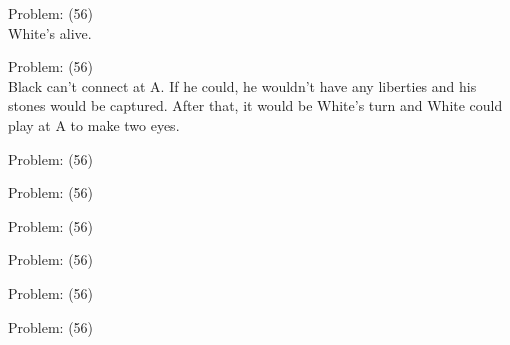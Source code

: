 \documentclass[11pt]{article}
\begin{document}
\begin{minipage}[t]{0.5\textwidth}
  {\centering
  
Problem: (56)\\
White's alive.\\
  }
\end{minipage}
\begin{minipage}[t]{0.5\textwidth}
  {\centering
  
Problem: (56)\\
Black can't connect at A. If he could, he wouldn't have any liberties and his stones would be captured. After that, it would be White’s turn and White could play at A to make two eyes.\\
  }
\end{minipage}
\begin{minipage}[t]{0.5\textwidth}
  {\centering
  
Problem: (56)\\
  }
\end{minipage}
\begin{minipage}[t]{0.5\textwidth}
  {\centering
  
Problem: (56)\\
  }
\end{minipage}
\begin{minipage}[t]{0.5\textwidth}
  {\centering
  
Problem: (56)\\
  }
\end{minipage}
\begin{minipage}[t]{0.5\textwidth}
  {\centering
  
Problem: (56)\\
  }
\end{minipage}
\begin{minipage}[t]{0.5\textwidth}
  {\centering
  
Problem: (56)\\
  }
\end{minipage}
\begin{minipage}[t]{0.5\textwidth}
  {\centering
  
Problem: (56)\\
  }
\end{minipage}
\end{document}
